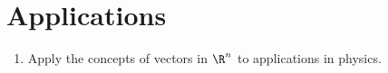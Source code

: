 \section{Applications}

\begin{outcome}
  \begin{enumerate}
  \item Apply the concepts of vectors in $\R^n$ to applications in
    physics.
  \end{enumerate}
\end{outcome}
